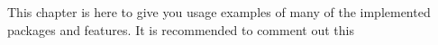 
This chapter is here to give you usage examples of many of the implemented packages and features.
It is recommended to comment out this